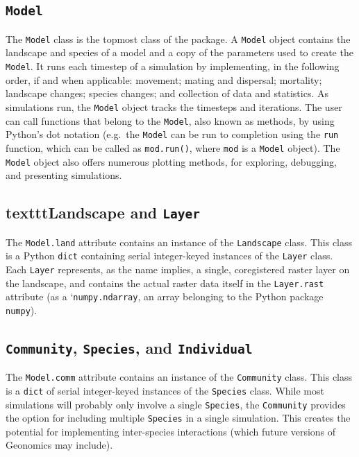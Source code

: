 ﻿\documentclass{article}
\begin{document}
\subsection{\texttt{Model}}
The \texttt{Model} class is the topmost class of the package.
A \texttt{Model} object contains the landscape and species of a model and a copy of the
parameters used to create the \texttt{Model}.
It runs each timestep of a simulation by implementing, in the following order,
if and when applicable: movement; mating and dispersal; mortality;
landscape changes; species changes; and collection of data and statistics.
As simulations run, the \texttt{Model} object tracks the timesteps and iterations.
The user can call functions that belong to the \texttt{Model}, also known as methods,
by using Python's dot notation (e.g.\ the \texttt{Model} can be run to completion using
the \texttt{run} function, which can be called as \texttt{mod.run()},
where \texttt{mod} is a \texttt{Model}
object). The \texttt{Model} object also offers numerous plotting methods, for exploring,
debugging, and presenting simulations.


\subsection{texttt{Landscape} and \texttt{Layer}}
The \texttt{Model.land} attribute contains an instance of the \texttt{Landscape} class.
This class is a Python \texttt{dict} containing serial integer-keyed instances of the
\texttt{Layer} class. Each \texttt{Layer} represents, as the name implies, a single,
coregistered raster layer on the landscape, and contains the actual raster data itself
in the \texttt{Layer.rast} attribute (as a `\texttt{numpy.ndarray}, an array belonging to the
Python package \texttt{numpy}).


\subsection{\texttt{Community}, \texttt{Species}, and \texttt{Individual}}
The \texttt{Model.comm} attribute contains an instance of the \texttt{Community} class.
This class is a \texttt{dict} of serial integer-keyed instances of the 
\texttt{Species} class. 
While most simulations will probably only involve a single \texttt{Species},
the \texttt{Community} provides the option for including multiple 
\texttt{Species} in a single simulation.
This creates the potential for implementing inter-species interactions (which future
versions of Geonomics may include).
\end{document}
